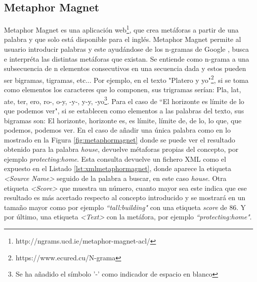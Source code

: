 

\subsection{Metaphor Magnet}
\label{cap:subsec:metaphormagnet}
Metaphor Magnet es una aplicación web\footnote{http://ngrams.ucd.ie/metaphor-magnet-acl/}, que crea metáforas a partir de una palabra y que solo está disponible para el inglés.
Metaphor Magnet permite al usuario introducir palabras y este ayudándose de los n-gramas de Google \citep{VealeT2012}, busca e interpréta las distintas metáforas que existan.
Se entiende como n-grama \citep{ngrama1999} a una subsecuencia de n elementos consecutivos en una secuencia dada y estos pueden ser bigramas, tigramas, etc... Por ejemplo, en el texto "Platero y yo"\footnote{https://www.ecured.cu/N-grama}, si se toma como elementos los caracteres que lo componen, sus trigramas serían: Pla, lat, ate, ter, ero, ro-, o-y, -y-, y-y, -yo\footnote{Se ha añadido el símbolo '-'  como indicador de espacio en blanco}.
Para el caso de  ``El horizonte es límite de lo que podemos ver", si se establecen como elementos a las palabras del texto, sus bigramas son: El horizonte, horizonte es, es límite, límite de, de lo, lo que, que podemos, podemos ver.
En el caso de añadir una única palabra como en lo mostrado en la Figura \ref{fig:metaphormagnet} donde se puede ver el resultado obtenido para la palabra \textit{house}, devuelve métaforas propias del concepto, por ejemplo \textit{protecting:home}.
Esta consulta devuelve un fichero XML como el expuesto en el Listado \ref{lst:xmlmetaphormagnet}, donde aparece la etiqueta \textit{<Source Name>} seguido de la palabra a buscar, en este caso \textit{house}. Otra etiqueta \textit{<Score>} que muestra un número, cuanto mayor sea este indica que ese resultado es más acertado respecto al concepto introducido y se mostrará en un tamaño mayor como por ejemplo \textit{``tall:building"} con una etiqueta \textit{score} de 86. Y por último, una etiqueta \textit{<Text>} con la metáfora, por ejemplo \textit{``protecting:home"}.



